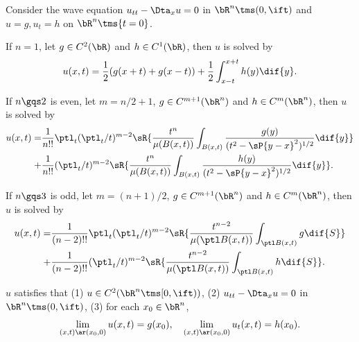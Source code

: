\documentclass[a4paper, twoside]{article}
\begin{document}
\begin{thm}
    Consider the wave equation $u_{tt}-\Dta_{x}u =0$ in $\bR^{n}\tms(0,\ift)$ and $u=g, u_{t}=h$ on $\bR^{n}\tms\{t=0\}$.
    \begin{itm}
    \item If $n=1$, let $g\in C^{2}(\bR)$ and $h\in C^{1}(\bR)$, then $u$ is solved by
    \[
        u(x,t)=\frac{1}{2}(g(x+t)+g(x-t))+\frac{1}{2}\int_{x-t}^{x+t}h(y)\dif{y}.
    \]
    \item If $n\gqs2$ is even, let $m=n/2+1$, $g\in C^{m+1}(\bR^{n})$ and $h\in C^{m}(\bR^{n})$, then $u$ is solved by
    \begin{align*}
      u(x,t)=&\frac{1}{n!!}\ptl_{t}(\ptl_{t}/t)^{m-2}\sR{\frac{t^{n}}{\mu(B(x,t))}\int_{B(x,t)}\frac{g(y)}{(t^{2}-\sP{y-x}^{2})^{1/2}}\dif{y}}\\
      +&\frac{1}{n!!}(\ptl_{t}/t)^{m-2}\sR{\frac{t^{n}}{\mu(B(x,t))}\int_{B(x,t)}\frac{h(y)}{(t^{2}-\sP{y-x}^{2})^{1/2}}\dif{y}}.
    \end{align*}

    \item If $n\gqs3$ is odd, let $m=(n+1)/2$, $g\in C^{m+1}(\bR^{n})$ and $h\in C^{m}(\bR^{n})$, then $u$ is solved by
    \begin{align*}
      u(x,t)=&\frac{1}{(n-2)!!}\ptl_{t}(\ptl_{t}/t)^{m-2}\sR{\frac{t^{n-2}}{\mu(\ptl B(x,t))}\int_{\ptl B(x,t)}g\dif{S}}\\
      +&\frac{1}{(n-2)!!}(\ptl_{t}/t)^{m-2}\sR{\frac{t^{n-2}}{\mu(\ptl B(x,t))}\int_{\ptl B(x,t)}h\dif{S}}.
    \end{align*}
    \end{itm}

    $u$ satisfies that (1) $u\in C^{2}(\bR^{n}\tms[0,\ift))$, (2) $u_{tt}-\Dta_{x}u=0$ in $\bR^{n}\tms(0,\ift)$, (3) for each $x_{0}\in\bR^{n}$,
    \[
        \lim_{(x,t)\ar(x_{0},0)}u(x,t)=g(x_{0}),\quad \lim_{(x,t)\ar(x_{0},0)}u_{t}(x,t)=h(x_{0}).
    \]
\end{thm}

\printref
\end{document}
